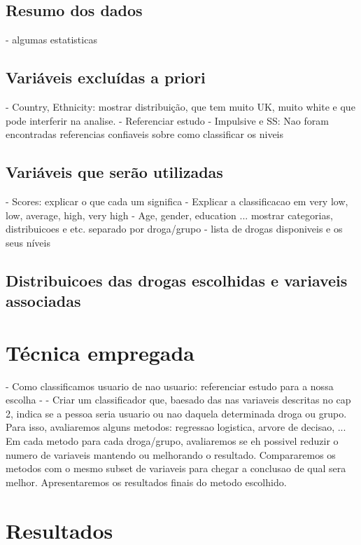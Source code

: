\documentclass[
	article,			%
	11pt,				%
	oneside,			%
	a4paper,			%
	english,			%
	brazil,				%
	sumario=tradicional
	]{abntex2}
\begin{document}
\subsection{Resumo dos dados}
- algumas estatisticas

\subsection{Variáveis excluídas a priori}
- Country, Ethnicity: mostrar distribuição, que tem muito UK, muito white e que pode interferir na analise. 
- Referenciar estudo 
- Impulsive e SS: Nao foram encontradas referencias confiaveis sobre como classificar os niveis

\subsection{Variáveis que serão utilizadas}
- Scores: explicar o que cada um significa
- Explicar a classificacao em very low, low, average, high, very high
- Age, gender, education ... mostrar categorias, distribuicoes e etc. separado por droga/grupo
- lista de drogas disponiveis e os seus níveis

\subsection{Distribuicoes das drogas escolhidas e variaveis associadas}

\lipsum[5]

\section{Técnica empregada}

- Como classificamos usuario de nao usuario: referenciar estudo para a nossa escolha
- 
- Criar um classificador que, baesado das nas variaveis descritas no cap 2, indica se a pessoa seria usuario ou nao daquela determinada droga ou grupo. 
Para isso, avaliaremos alguns metodos: regressao logistica, arvore de decisao, ... Em cada metodo para cada droga/grupo, avaliaremos se eh possivel reduzir o numero de variaveis mantendo ou melhorando o resultado. Compararemos os metodos com o mesmo subset de variaveis para chegar a conclusao de qual sera melhor. Apresentaremos os resultados finais do metodo escolhido. 

\lipsum[6]

\section{Resultados}
\end{document}
